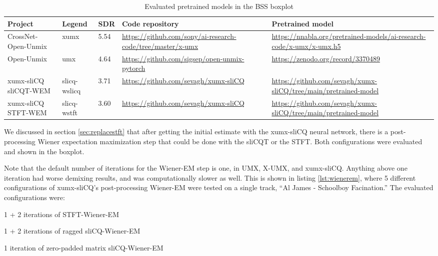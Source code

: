 \documentclass[report.tex]{subfiles}
\begin{document}
\begin{table}[ht]
	\centering
	\begin{tabular}{ |p{2.5cm}|l|l|p{3.5cm}|p{3.5cm}| }
	 \hline
		Project & Legend & SDR & Code repository & Pretrained model \\
	 \hline
	 \hline
		CrossNet-Open-Unmix & xumx & 5.54 & \url{https://github.com/sony/ai-research-code/tree/master/x-umx} & \url{https://nnabla.org/pretrained-models/ai-research-code/x-umx/x-umx.h5} \\
	 \hline
		Open-Unmix & umx & 4.64 & \url{https://github.com/sigsep/open-unmix-pytorch} & \url{https://zenodo.org/record/3370489} \\
	 \hline
		\makecell[l]{xumx-sliCQ \\ sliCQT-WEM} & slicq-wslicq & 3.71 & \url{https://github.com/sevagh/xumx-sliCQ} & \url{https://github.com/sevagh/xumx-sliCQ/tree/main/pretrained-model} \\
	 \hline
		\makecell[l]{xumx-sliCQ \\ STFT-WEM} & slicq-wstft & 3.60 & \url{https://github.com/sevagh/xumx-sliCQ} & \url{https://github.com/sevagh/xumx-sliCQ/tree/main/pretrained-model} \\
	 \hline
\end{tabular}
	\caption{Evaluated pretrained models in the BSS boxplot}
	\label{table:bsseval}
\end{table}

We discussed in section \ref{sec:replacestft} that after getting the initial estimate with the xumx-sliCQ neural network, there is a post-processing Wiener expectation maximization step that could be done with the sliCQT or the STFT. Both configurations were evaluated and shown in the boxplot.

Note that the default number of iterations for the Wiener-EM step is one, in UMX, X-UMX, and xumx-sliCQ. Anything above one iteration had worse demixing results, and was computationally slower as well. This is shown in listing \ref{lst:wienerem}, where 5 different configurations of xumx-sliCQ's post-processing Wiener-EM were tested on a single track, ``Al James - Schoolboy Facination.'' The evaluated configurations were:
\begin{tight_enumerate}
	\item
		1 + 2 iterations of STFT-Wiener-EM
	\item
		1 + 2 iterations of ragged sliCQ-Wiener-EM
	\item
		1 iteration of zero-padded matrix sliCQ-Wiener-EM
\end{tight_enumerate}
\end{document}
